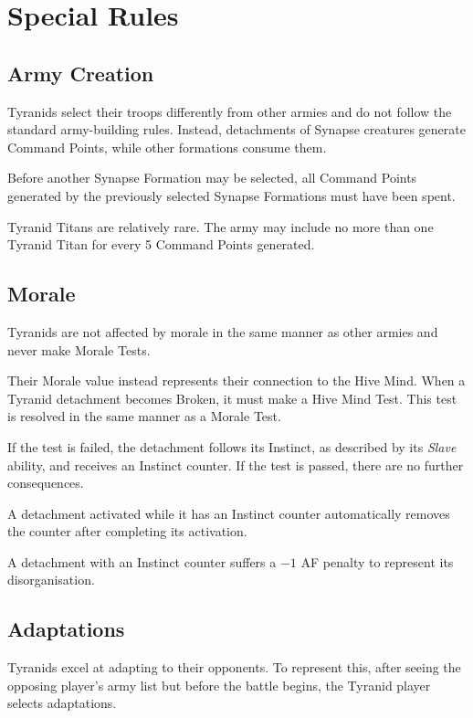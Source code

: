 \section{Special Rules}

\subsection{Army Creation}

Tyranids select their troops differently from other armies and do not follow the standard army-building rules. Instead, detachments of Synapse creatures generate Command Points, while other formations consume them.

Before another Synapse Formation may be selected, all Command Points generated by the previously selected Synapse Formations must have been spent.

Tyranid Titans are relatively rare. The army may include no more than one Tyranid Titan for every 5 Command Points generated.

\subsection{Morale}

Tyranids are not affected by morale in the same manner as other armies and never make Morale Tests.

Their Morale value instead represents their connection to the Hive Mind. When a Tyranid detachment becomes Broken, it must make a Hive Mind Test. This test is resolved in the same manner as a Morale Test.

If the test is failed, the detachment follows its Instinct, as described by its \textit{Slave} ability, and receives an Instinct counter. If the test is passed, there are no further consequences.

A detachment activated while it has an Instinct counter automatically removes the counter after completing its activation.

A detachment with an Instinct counter suffers a $-1$ AF penalty to represent its disorganisation.

\subsection{Adaptations}

Tyranids excel at adapting to their opponents. To represent this, after seeing the opposing player's army list but before the battle begins, the Tyranid player selects adaptations.


